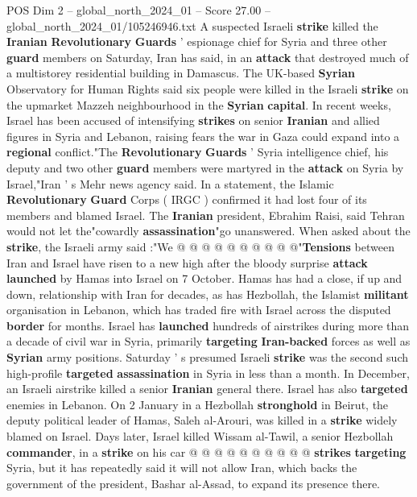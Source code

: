 \begin{textsample}{POS Dim 2 – global\_north\_2024\_01 – Score 27.00 – global\_north\_2024\_01/105246946.txt}  \label{ex:f2_pos_110}
A suspected Israeli \textbf{strike} killed the \textbf{Iranian} \textbf{Revolutionary} \textbf{Guards} ' espionage chief for Syria and three other \textbf{guard} members on Saturday, Iran has said, in an \textbf{attack} that destroyed much of a multistorey residential building in Damascus.
The UK-based \textbf{Syrian} Observatory for Human Rights said six people were killed in the Israeli \textbf{strike} on the upmarket Mazzeh neighbourhood in the \textbf{Syrian} \textbf{capital}.
In recent weeks, Israel has been accused of intensifying \textbf{strikes} on senior \textbf{Iranian} and allied figures in Syria and Lebanon, raising fears the war in Gaza could expand into a \textbf{regional} conflict."The \textbf{Revolutionary} \textbf{Guards} ' Syria intelligence chief, his deputy and two other \textbf{guard} members were martyred in the \textbf{attack} on Syria by Israel,"Iran ' s Mehr news agency said.
In a statement, the Islamic \textbf{Revolutionary} \textbf{Guard} Corps ( IRGC ) confirmed it had lost four of its members and blamed Israel.
The \textbf{Iranian} president, Ebrahim Raisi, said Tehran would not let the"cowardly \textbf{assassination}"go unanswered.
When asked about the \textbf{strike}, the Israeli army said :"We @ @ @ @ @ @ @ @ @ @"\textbf{Tensions} between Iran and Israel have risen to a new high after the bloody surprise \textbf{attack} \textbf{launched} by Hamas into Israel on 7 October.
Hamas has had a close, if up and down, relationship with Iran for decades, as has Hezbollah, the Islamist \textbf{militant} organisation in Lebanon, which has traded fire with Israel across the disputed \textbf{border} for months.
Israel has \textbf{launched} hundreds of airstrikes during more than a decade of civil war in Syria, primarily \textbf{targeting} \textbf{Iran-backed} forces as well as \textbf{Syrian} army positions.
Saturday ' s presumed Israeli \textbf{strike} was the second such high-profile \textbf{targeted} \textbf{assassination} in Syria in less than a month.
In December, an Israeli airstrike killed a senior \textbf{Iranian} general there.
Israel has also \textbf{targeted} enemies in Lebanon.
On 2 January in a Hezbollah \textbf{stronghold} in Beirut, the deputy political leader of Hamas, Saleh al-Arouri, was killed in a \textbf{strike} widely blamed on Israel.
Days later, Israel killed Wissam al-Tawil, a senior Hezbollah \textbf{commander}, in a \textbf{strike} on his car @ @ @ @ @ @ @ @ @ @ \textbf{strikes} \textbf{targeting} Syria, but it has repeatedly said it will not allow Iran, which backs the government of the president, Bashar al-Assad, to expand its presence there.

\end{textsample}
